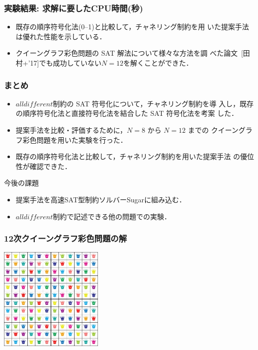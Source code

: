 \documentclass [dvipdfmx,11pt]{beamer}
\newcommand{\alldifferent}{$alldifferent$}
\begin{document}
\begin{frame}
  \frametitle{実験結果: 求解に要したCPU時間(秒)}
  \begin{block}{}\centering
    \tiny
    
  \end{block}
  \begin{itemize}
  \item 既存の順序符号化法(0--1)と比較して，チャネリング制約を用
    いた提案手法は優れた性能を示している．
  \item クイーングラフ彩色問題の SAT 解法について様々な方法を調
    べた論文~[田村+'17]でも成功していない$N=12$を解くことができた．
  \end{itemize}
\end{frame}


\begin{frame}
  \frametitle{まとめ}

  \begin{itemize}
  \item {\alldifferent}制約の SAT 符号化について，チャネリング制約を導
    入し，既存の順序符号化法と直接符号化法を結合した SAT 符号化法を考案
    した．
  \item 提案手法を比較・評価するために，$N=8$ から $N=12$ までの
    クイーングラフ彩色問題を用いた実験を行った．
  \item 既存の順序符号化法と比較して，チャネリング制約を用いた提案手法
    の優位性が確認できた．
  \end{itemize}

\begin{exampleblock}{今後の課題}
  \begin{itemize}
  \item 提案手法を高速SAT型制約ソルバーSugarに組み込む．
  \item {\alldifferent}制約で記述できる他の問題での実験．
  \end{itemize}
\end{exampleblock}
\end{frame}

\begin{frame}
    \frametitle{12次クイーングラフ彩色問題の解}
    \begin{exampleblock}{}\centering
        \includegraphics[width=5cm]{images/qgcp_12.jpg}
    \end{exampleblock}
\end{frame}


\end{document}
